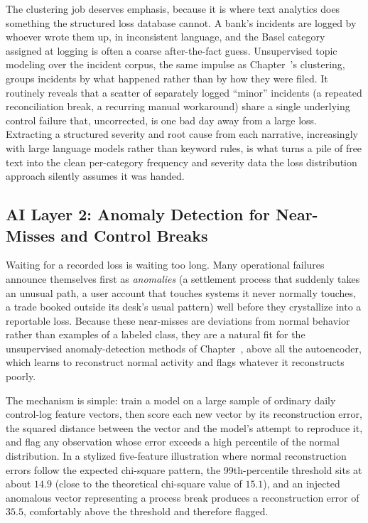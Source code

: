 \documentclass[../ai_in_finance]{subfiles}
\begin{document}
The clustering job deserves emphasis, because it is where text analytics does something the structured loss database cannot. A bank's incidents are logged by whoever wrote them up, in inconsistent language, and the Basel category assigned at logging is often a coarse after-the-fact guess. Unsupervised topic modeling over the incident corpus, the same impulse as Chapter~'s clustering, groups incidents by what happened rather than by how they were filed. It routinely reveals that a scatter of separately logged ``minor'' incidents (a repeated reconciliation break, a recurring manual workaround) share a single underlying control failure that, uncorrected, is one bad day away from a large loss. Extracting a structured severity and root cause from each narrative, increasingly with large language models rather than keyword rules, is what turns a pile of free text into the clean per-category frequency and severity data the loss distribution approach silently assumes it was handed.

\subsection{AI Layer 2: Anomaly Detection for Near-Misses and Control Breaks}
\label{sec:oprisk-anomaly}

Waiting for a recorded loss is waiting too long. Many operational failures announce themselves first as \emph{anomalies} (a settlement process that suddenly takes an unusual path, a user account that touches systems it never normally touches, a trade booked outside its desk's usual pattern) well before they crystallize into a reportable loss. Because these near-misses are deviations from normal behavior rather than examples of a labeled class, they are a natural fit for the unsupervised anomaly-detection methods of Chapter~, above all the autoencoder, which learns to reconstruct normal activity and flags whatever it reconstructs poorly.

The mechanism is simple: train a model on a large sample of ordinary daily control-log feature vectors, then score each new vector by its reconstruction error, the squared distance between the vector and the model's attempt to reproduce it, and flag any observation whose error exceeds a high percentile of the normal distribution. In a stylized five-feature illustration where normal reconstruction errors follow the expected chi-square pattern, the 99th-percentile threshold sits at about $14.9$ (close to the theoretical chi-square value of $15.1$), and an injected anomalous vector representing a process break produces a reconstruction error of $35.5$, comfortably above the threshold and therefore flagged.
\end{document}
